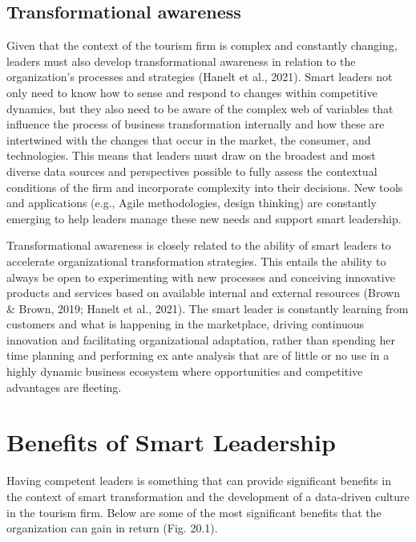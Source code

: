 \documentclass[
  letterpaper,
  DIV=11,
  numbers=noendperiod]{scrreprt}
\begin{document}
\hypertarget{transformational-awareness}{%
\subsection{Transformational
awareness}\label{transformational-awareness}}

Given that the context of the tourism firm is complex and constantly
changing, leaders must also develop transformational awareness in
relation to the organization's processes and strategies (Hanelt et al.,
2021). Smart leaders not only need to know how to sense and respond to
changes within competitive dynamics, but they also need to be aware of
the complex web of variables that influence the process of business
transformation internally and how these are intertwined with the changes
that occur in the market, the consumer, and technologies. This means
that leaders must draw on the broadest and most diverse data sources and
perspectives possible to fully assess the contextual conditions of the
firm and incorporate complexity into their decisions. New tools and
applications (e.g., Agile methodologies, design thinking) are constantly
emerging to help leaders manage these new needs and support smart
leadership.

Transformational awareness is closely related to the ability of smart
leaders to accelerate organizational transformation strategies. This
entails the ability to always be open to experimenting with new
processes and conceiving innovative products and services based on
available internal and external resources (Brown \& Brown, 2019; Hanelt
et al., 2021). The smart leader is constantly learning from customers
and what is happening in the marketplace, driving continuous innovation
and facilitating organizational adaptation, rather than spending her
time planning and performing ex ante analysis that are of little or no
use in a highly dynamic business ecosystem where opportunities and
competitive advantages are fleeting.

\hypertarget{benefits-of-smart-leadership}{%
\section{Benefits of Smart
Leadership}\label{benefits-of-smart-leadership}}

Having competent leaders is something that can provide significant
benefits in the context of smart transformation and the development of a
data-driven culture in the tourism firm. Below are some of the most
significant benefits that the organization can gain in return (Fig.
20.1).
\end{document}
